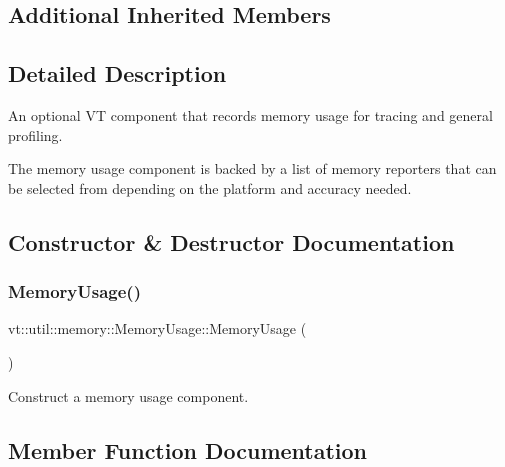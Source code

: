 \subsection*{Additional Inherited Members}


\subsection{Detailed Description}
An optional VT component that records memory usage for tracing and general profiling. 

The memory usage component is backed by a list of memory reporters that can be selected from depending on the platform and accuracy needed. 

\subsection{Constructor \& Destructor Documentation}
\mbox{\label{structvt_1_1util_1_1memory_1_1_memory_usage_a5838280c7b2b24ab8ed2aff450b5e98f}} 
\subsubsection{\texorpdfstring{Memory\+Usage()}{MemoryUsage()}}
{\footnotesize\ttfamily vt\+::util\+::memory\+::\+Memory\+Usage\+::\+Memory\+Usage (\begin{DoxyParamCaption}{ }\end{DoxyParamCaption})}



Construct a memory usage component. 



\subsection{Member Function Documentation}
\mbox{\label{structvt_1_1util_1_1memory_1_1_memory_usage_ad047c8acc218403b53ec97c82fa7d7e3}} 
